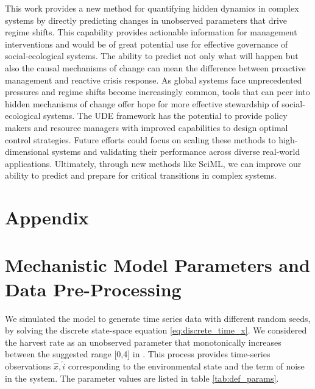 \documentclass[openacc]{rsproca_new}%
\begin{document}
This work provides a new method for quantifying hidden dynamics in complex systems by directly predicting changes in unobserved parameters that drive regime shifts. This capability provides actionable information for management interventions and would be of great potential use for effective governance of social-ecological systems. The ability to predict not only what will happen but also the causal mechanisms of change can mean the difference between proactive management and reactive crisis response. As global systems face unprecedented pressures and regime shifts become increasingly common, tools that can peer into hidden mechanisms of change offer hope for more effective stewardship of social-ecological systems. The UDE framework has the potential to provide policy makers and resource managers with improved capabilities to design optimal control strategies. Future efforts could focus on scaling these methods to high-dimensional systems and validating their performance across diverse real-world applications. Ultimately, through new methods like SciML, we can improve our ability to predict and prepare for critical transitions in complex systems.






\newpage
\section*{Appendix}
\appendix
\section{Mechanistic Model Parameters and Data Pre-Processing}

We simulated the \textcite{Tilman2024} model to generate time series data with different random seeds, by solving the discrete state-space equation \eqref{eq:discrete_time_x}. We considered the harvest rate as an unobserved parameter that monotonically increases between the suggested range [0,4] in \textcite{Tilman2024}. This process provides time-series observations $\hat{x}, \hat{i}$ corresponding to the environmental state and the term of noise in the system.
The parameter values are listed in table \ref{tab:def_params}.
\end{document}
